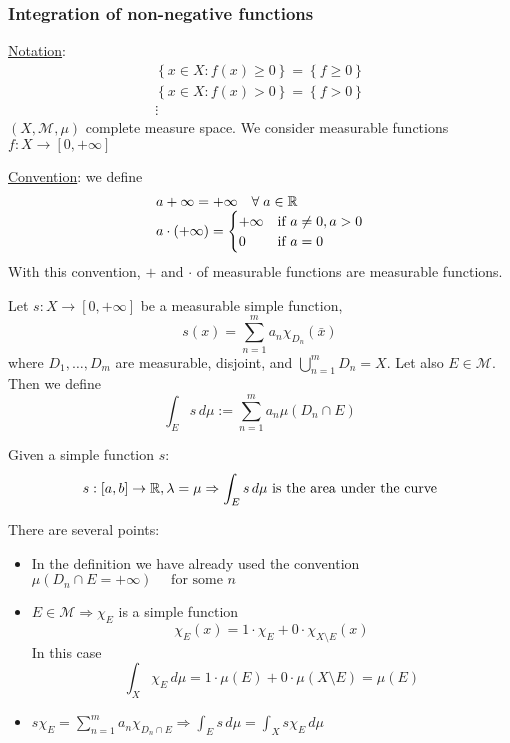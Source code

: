 \subsubsection*{Integration of non-negative functions}
\underline{Notation}: \[
    \begin{array}{c}
        \left\{ x \in X : f(x) \geq 0 \right\} = \left\{ f \geq 0 \right\} \\
        \left\{ x \in X : f(x) > 0 \right\} = \left\{ f > 0 \right\}   \\
        \vdots
    \end{array}
    \]
\((X, \mathcal{M}, \mu)\) complete measure space.
We consider measurable functions \(f: X \to [0, +\infty]\)

\underline{Convention}: we define 
\[
    \begin{array}{l}
        a + \infty = +\infty \quad \forall \; a \in \mathbb{R} \\
        a \cdot (+\infty) = \begin{cases}
            +\infty & \mbox{if } a \neq 0, a > 0 \\
            0 & \mbox{if } a = 0
        \end{cases}        
    \end{array}
\]
With this convention, \(+ \) and \( \cdot\) of measurable functions are measurable functions.
\begin{definition}
    Let \(s: X \to [0, +\infty]\) be a measurable simple function, 
    \[
        s(x) = \sum_{n=1}^m a_n \chi_{D_n}(\bar{x})
    \]
    where \(D_1,\ldots,D_m\) are measurable, disjoint, and \(\bigcup_{n=1}^m D_n = X\). Let also \(E \in \mathcal{M}\). Then we define 
    \[
        \int_E s \, d\mu := \sum_{n=1}^m a_n \mu(D_n \cap E)
    \]
\end{definition}
\begin{remark}
    Given a simple function \(s\):
    \[s:[a,b] \to \mathbb{R}, \lambda = \mu \Rightarrow \int_E s \, d\mu \mbox{ is the area under the curve}\]
\end{remark}
\begin{remark}
    There are several points:
    \begin{itemize}
        \item In the definition we have already used the convention \(\mu(D_n \cap E = +\infty) \quad \mbox{ for some }n\)
        \item \(E \in \mathcal{M} \Rightarrow \chi_E\) is a simple function
        \[
            \chi_E(x) = 1 \cdot \chi_E + 0 \cdot \chi_{X\setminus E}(x)
        \] 
        In this case 
        \[
            \int_X \chi_E \, d\mu = 1\cdot \mu(E) + 0 \cdot \mu(X\setminus E) = \mu(E)
        \]
        \item \(s\chi_E = \sum_{n=1}^m a_n\chi_{D_n \cap E} \Rightarrow \int_E s\, d\mu = \int_X s\chi_E \, d\mu\)
    \end{itemize}
\end{remark}

